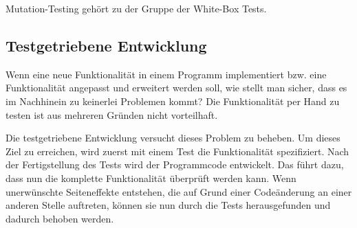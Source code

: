 Mutation-Testing gehört zu der Gruppe der White-Box Tests.

\subsection{Testgetriebene Entwicklung}
Wenn eine neue Funktionalität in einem Programm implementiert bzw. eine Funktionalität angepasst und erweitert werden soll, wie stellt man sicher, dass es im Nachhinein zu keinerlei Problemen kommt? Die Funktionalität per Hand zu testen ist aus mehreren Gründen nicht vorteilhaft.

Die testgetriebene Entwicklung versucht dieses Problem zu beheben. Um dieses Ziel zu erreichen, wird zuerst mit einem Test die Funktionalität spezifiziert. Nach der Fertigstellung des Tests wird der Programmcode entwickelt. Das führt dazu, dass nun die komplette Funktionalität überprüft werden kann. Wenn unerwünschte Seiteneffekte entstehen, die auf Grund einer Codeänderung an einer anderen Stelle auftreten, können sie nun durch die Tests herausgefunden und dadurch behoben werden.






